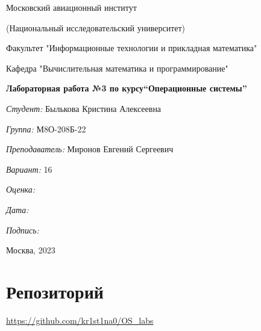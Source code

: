 \documentclass[a4paper, 12pt]{article}
\begin{document}
\thispagestyle{empty}	
\begin{center}
	Московский авиационный институт
	
	(Национальный исследовательский университет)
	
	Факультет "Информационные технологии и прикладная математика"
	
	Кафедра "Вычислительная математика и программирование"
	
\end{center}
\vspace{40ex}
\begin{center}
	\textbf{\large{Лабораторная работа №3 по курсу\linebreak \textquotedblleft Операционные системы\textquotedblright}}
\end{center}
\vspace{35ex}
\begin{flushright}
	\textit{Студент: } Былькова Кристина Алексеевна
	
	\vspace{2ex}
	\textit{Группа: } М8О-208Б-22
	
	\vspace{2ex}
	\textit{Преподаватель: } Миронов Евгений Сергеевич
	
	\vspace{2ex}
	\textit{Вариант: } 16 
	
	\vspace{2ex}
	\textit{Оценка: } \underline{\quad\quad\quad\quad\quad\quad}
	
	 \vspace{2ex}
	\textit{Дата: } \underline{\quad\quad\quad\quad\quad\quad}
	
	\vspace{2ex}
	\textit{Подпись: } \underline{\quad\quad\quad\quad\quad\quad}
	
\end{flushright}

\vspace{5ex}

\begin{vfill}
	\begin{center}
		Москва, 2023
	\end{center}	
\end{vfill}
\newpage

\begingroup
\color{black}
\tableofcontents\newpage
\endgroup

\section{Репозиторий}
\href{https://github.com/kr1st1na0/OS\_labs}{https://github.com/kr1st1na0/OS\_labs}
\end{document}
